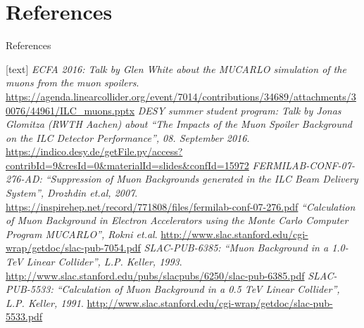 \documentclass[xcolor={dvipsnames}]{beamer}
\begin{document}
\section{References}
\begin{frame}{References}
\tiny
\begin{thebibliography}{9}
[text]
  \emph{ECFA 2016: Talk by Glen White about the MUCARLO simulation of the muons from the muon spoilers}. \url{https://agenda.linearcollider.org/event/7014/contributions/34689/attachments/30076/44961/ILC_muons.pptx}
  \emph{DESY summer student program: Talk by Jonas Glomitza (RWTH Aachen) about ``The Impacts of the Muon Spoiler Background on the ILC Detector Performance'', 08. September 2016}. \url{https://indico.desy.de/getFile.py/access?contribId=9&resId=0&materialId=slides&confId=15972}
  \emph{FERMILAB-CONF-07-276-AD: ``Suppression of Muon Backgrounds generated in the ILC Beam Delivery System'', Drozhdin et.al, 2007}. \url{https://inspirehep.net/record/771808/files/fermilab-conf-07-276.pdf}
  \emph{``Calculation of Muon Background in Electron Accelerators using the Monte Carlo Computer Program MUCARLO'', Rokni et.al}. \url{http://www.slac.stanford.edu/cgi-wrap/getdoc/slac-pub-7054.pdf}
  \emph{SLAC-PUB-6385: ``Muon Background in a 1.0-TeV Linear Collider'', L.P. Keller, 1993}. \url{http://www.slac.stanford.edu/pubs/slacpubs/6250/slac-pub-6385.pdf}
  \emph{SLAC-PUB-5533: ``Calculation of Muon Background in a 0.5 TeV Linear Collider'', L.P. Keller, 1991}. \url{http://www.slac.stanford.edu/cgi-wrap/getdoc/slac-pub-5533.pdf}
\end{thebibliography}
\end{frame}
\end{document}

